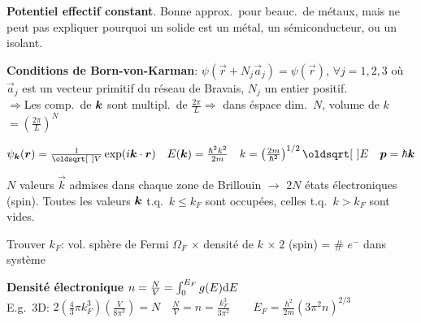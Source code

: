\textbf{Potentiel eﬀectif constant}. Bonne approx.\ pour beauc.\ de métaux, mais ne peut pas expliquer pourquoi un solide est un métal, un sémiconducteur, ou un isolant.
\begin{squishlist}
    \item \textbf{Conditions de Born-von-Karman}: $\psi(\vec{r} + N_j \vec{a}_j) = \psi(\vec{r}), \, \forall j=1,2,3$ où $\vec{a}_j$ est un vecteur primitif du réseau de Bravais, $N_j$ un entier positif. \\
    $\Rightarrow$Les comp.\ de $\bm{k}$ sont multipl.\ de $\frac{2\pi}{L} \Longrightarrow$ dans éspace dim.\ $N$, volume de $k$ $=\left(\frac{2\pi}{L}\right)^N$
    \item $\psi_{\vk}(\vr) = \frac{1}{\sqrt{V}}\exp(i \vk \cdot \vr) \quad E(\vk) = \frac{\hbar^2 k^2}{2m} \quad k = \left(\frac{2m}{\hbar^2}\right)^{1/2} \sqrt{E} \quad \vec{p}=\hbar \vec{k}$
    \item $N$ valeurs $\vec{k}$ admises dans chaque zone de Brillouin $\rightarrow$ $2N$ états électroniques (spin). Toutes les valeurs $\bm{k}$ t.q.\ $k\leq k_F$ sont occupées, celles t.q.\ $k > k_F$ sont vides.
    \item Trouver $k_F$: vol. sphère de Fermi $\Omega_F$ $\times$ densité de $k$ $\times \; 2$ (spin) = \# $e^-$ dans système 
    
    \item \textbf{Densité électronique} $n = \frac{N}{V} = \int_0^{E_F} g(E) \textrm{d} E$ \\
    E.g.\ 3D: $2 \left( \frac{4}{3}\pi k^3_F\right) \left( \frac{V}{8\pi^3}\right) = N \quad \frac{N}{V} = n = \frac{k_F^3}{3\pi^2} \qquad E_F = \frac{\hbar^2}{2m}(3\pi^2 n)^{2/3}$


\end{squishlist}
